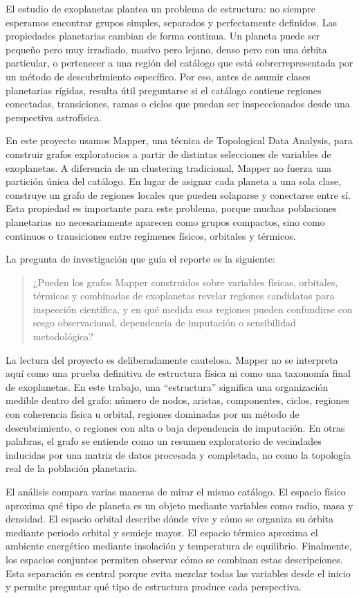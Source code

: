 El estudio de exoplanetas plantea un problema de estructura: no siempre esperamos encontrar grupos simples, separados y perfectamente definidos. Las propiedades planetarias cambian de forma continua. Un planeta puede ser pequeño pero muy irradiado, masivo pero lejano, denso pero con una órbita particular, o pertenecer a una región del catálogo que está sobrerrepresentada por un método de descubrimiento específico. Por eso, antes de asumir clases planetarias rígidas, resulta útil preguntarse si el catálogo contiene regiones conectadas, transiciones, ramas o ciclos que puedan ser inspeccionados desde una perspectiva astrofísica.

En este proyecto usamos Mapper, una técnica de Topological Data Analysis, para construir grafos exploratorios a partir de distintas selecciones de variables de exoplanetas. A diferencia de un clustering tradicional, Mapper no fuerza una partición única del catálogo. En lugar de asignar cada planeta a una sola clase, construye un grafo de regiones locales que pueden solaparse y conectarse entre sí. Esta propiedad es importante para este problema, porque muchas poblaciones planetarias no necesariamente aparecen como grupos compactos, sino como continuos o transiciones entre regímenes físicos, orbitales y térmicos.

La pregunta de investigación que guía el reporte es la siguiente:

\begin{quote}
¿Pueden los grafos Mapper construidos sobre variables físicas, orbitales, térmicas y combinadas de exoplanetas revelar regiones candidatas para inspección científica, y en qué medida esas regiones pueden confundirse con sesgo observacional, dependencia de imputación o sensibilidad metodológica?
\end{quote}

La lectura del proyecto es deliberadamente cautelosa. Mapper no se interpreta aquí como una prueba definitiva de estructura física ni como una taxonomía final de exoplanetas. En este trabajo, una ``estructura'' significa una organización medible dentro del grafo: número de nodos, aristas, componentes, ciclos, regiones con coherencia física u orbital, regiones dominadas por un método de descubrimiento, o regiones con alta o baja dependencia de imputación. En otras palabras, el grafo se entiende como un resumen exploratorio de vecindades inducidas por una matriz de datos procesada y completada, no como la topología real de la población planetaria.

El análisis compara varias maneras de mirar el mismo catálogo. El espacio físico aproxima qué tipo de planeta es un objeto mediante variables como radio, masa y densidad. El espacio orbital describe dónde vive y cómo se organiza su órbita mediante periodo orbital y semieje mayor. El espacio térmico aproxima el ambiente energético mediante insolación y temperatura de equilibrio. Finalmente, los espacios conjuntos permiten observar cómo se combinan estas descripciones. Esta separación es central porque evita mezclar todas las variables desde el inicio y permite preguntar qué tipo de estructura produce cada perspectiva.

